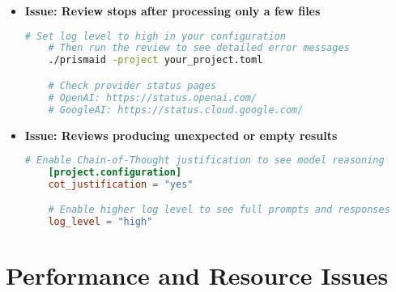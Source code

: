 \begin{itemize}
    \item \textbf{Issue: Review stops after processing only a few files}

    \begin{commandbox}
    \begin{lstlisting}[language=Bash]
    # Set log level to high in your configuration
    # Then run the review to see detailed error messages
    ./prismaid -project your_project.toml

    # Check provider status pages
    # OpenAI: https://status.openai.com/
    # GoogleAI: https://status.cloud.google.com/
    \end{lstlisting}
    \end{commandbox}


    \item \textbf{Issue: Reviews producing unexpected or empty results}

    \begin{configbox}
    \begin{lstlisting}[language=TOML]
    # Enable Chain-of-Thought justification to see model reasoning
    [project.configuration]
    cot_justification = "yes"

    # Enable higher log level to see full prompts and responses
    log_level = "high"
    \end{lstlisting}
    \end{configbox}

\end{itemize}

\section{Performance and Resource Issues}

